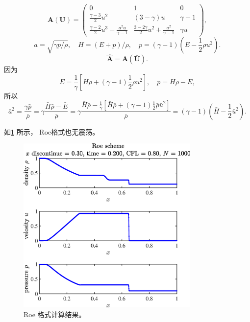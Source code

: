 \documentclass[12pt]{article}
\begin{document}
\begin{equation}
	\boldsymbol{A}(\boldsymbol{U})=\left(\begin{array}{ccc}
	0 & 1 & 0 \\
	\frac{\gamma-3}{2} u^{2} & (3-\gamma) u & \gamma-1 \\
	\frac{\gamma-2}{2} u^{3}-\frac{a^{2} u}{\gamma-1} & \frac{3-2 \gamma}{2} u^{2}+\frac{a^{2}}{\gamma-1} & \gamma u
	\end{array}\right),
\end{equation}
\begin{equation}
	a=\sqrt{\gamma p / \rho},\quad H=(E+p) / \rho,\quad p=(\gamma-1)\left(E-\frac{1}{2} \rho u^{2}\right).
\end{equation}
\begin{equation}
	\hat{\bm{A}}=\bm{A}(\bm{\bar{U}}).
\end{equation}
因为
\begin{equation}
	E=\frac{1}{\gamma}\left[H\rho+(\gamma-1)\frac{1}{2}\rho u^2\right],\quad p=H\rho - E,
\end{equation}
所以
\begin{equation}
	\bar{a}^2 = \frac{\gamma \bar{p}}{\bar{\rho}} = \gamma\frac{ \bar{H}\bar{\rho} - \bar{E}}{\bar{\rho}} = \gamma\frac{ \bar{H}\bar{\rho} - \frac{1}{\gamma}\left[\bar{H}\bar{\rho}+(\gamma-1)\frac{1}{2}\bar{\rho} \bar{u}^2\right]}{\bar{\rho}} =(\gamma-1) \left(\bar{H}-\frac{1}{2}\bar{u}^2\right).
\end{equation}


如\cref{fig:2Roe} 所示， Roe格式也无震荡。

\begin{figure}[htp]
	\centering
	\includegraphics[width=9cm]{2Roe.eps}
	\vspace{20pt}
	\caption{Roe 格式计算结果。}
	\label{fig:2Roe}
\end{figure}
\end{document}
